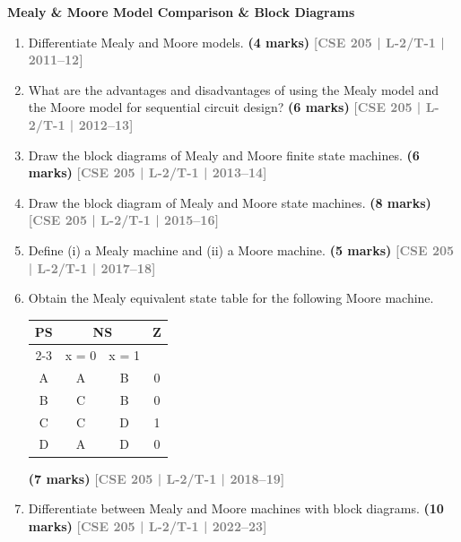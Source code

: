 \documentclass[12pt,a4paper]{article}
\newcommand{\yr}[1]{\hfill\textcolor{gray}{\small\textbf{[#1]}}}
\newcommand{\mk}[1]{\textcolor{orange!70!black}{\small\textbf{(#1 marks)}}}
\newcommand{\subtopic}[2]{%
  \vspace{10pt}
  \noindent\begin{tcolorbox}[colback=#1!8,colframe=#1,boxrule=0.6pt,arc=4pt,
    left=6pt,right=6pt,top=4pt,bottom=4pt]
    \small\bfseries\textcolor{#1}{#2}
  \end{tcolorbox}
  \vspace{2pt}
}
\begin{document}
\subtopic{cF}{Mealy \& Moore Model Comparison \& Block Diagrams}
\label{sub:s6-mealy-moore}

\begin{enumerate}

\item Differentiate Mealy and Moore models.
\mk{4} \yr{CSE 205 | L-2/T-1 | 2011--12}

\item What are the advantages and disadvantages of using the Mealy model and the Moore model for sequential circuit design?
\mk{6} \yr{CSE 205 | L-2/T-1 | 2012--13}

\item Draw the block diagrams of Mealy and Moore finite state machines.
\mk{6} \yr{CSE 205 | L-2/T-1 | 2013--14}


\item Draw the block diagram of Mealy and Moore state machines.
\mk{8} \yr{CSE 205 | L-2/T-1 | 2015--16}


\item Define (i) a Mealy machine and (ii) a Moore machine.
\mk{5} \yr{CSE 205 | L-2/T-1 | 2017--18}


\item Obtain the Mealy equivalent state table for the following Moore machine.

\begin{center}
  \begin{tabular}{|c|c|c|c|}
\hline
\multirow{2}{*}{PS} & \multicolumn{2}{c|}{NS} & \multirow{2}{*}{Z} \\ \cline{2-3}
 & x = 0 & x = 1 & \\ \hline
A & A & B & 0 \\ \hline
B & C & B & 0 \\ \hline
C & C & D & 1 \\ \hline
D & A & D & 0 \\ \hline
\end{tabular}
\end{center}

\mk{7} \yr{CSE 205 | L-2/T-1 | 2018--19}

\item Differentiate between Mealy and Moore machines with block diagrams.
\mk{10} \yr{CSE 205 | L-2/T-1 | 2022--23}


\end{enumerate}
\end{document}
